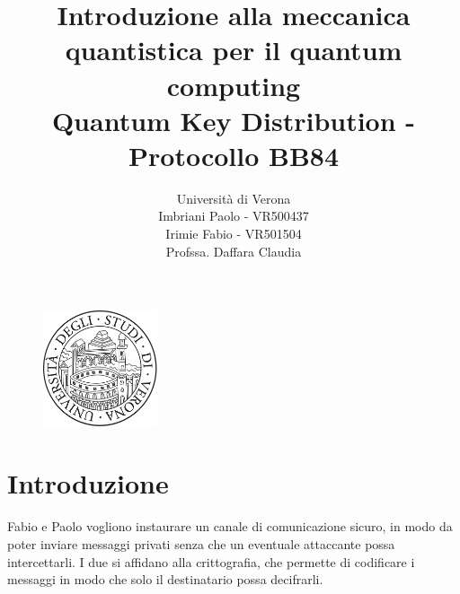 \documentclass[a4paper]{article}
\begin{document}
\title{Introduzione alla meccanica quantistica per il quantum computing\\[1ex]
\large Quantum Key Distribution - Protocollo BB84
}

\author{
\vspace{0.8cm}
Università di Verona\\
Imbriani Paolo - VR500437\\
Irimie Fabio - VR501504\\[8ex]
Profssa. Daffara Claudia
}

\begin{figure}
    \centering
    \includegraphics[width=0.3\textwidth]{UniversityofVerona}
\end{figure}

\maketitle 

\pagebreak

\tableofcontents

\pagebreak

\section{Introduzione}
Fabio e Paolo vogliono instaurare un canale di comunicazione sicuro, in modo da poter
inviare messaggi privati senza che un eventuale attaccante possa intercettarli.
I due si affidano alla crittografia, che permette di codificare i messaggi in modo che
solo il destinatario possa decifrarli.
\end{document}

